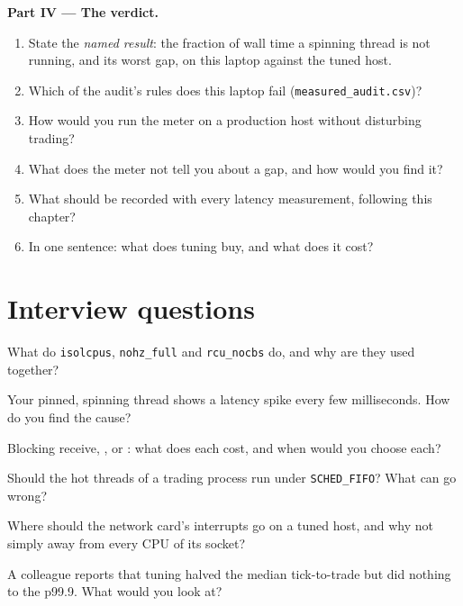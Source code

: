 \begin{problem}
\medskip\noindent\textbf{Part IV --- The verdict.}
\begin{enumerate}[resume]
\item State the \emph{named result}: the fraction of wall time a spinning thread is not running, and its worst gap, on this
laptop against the tuned host.
\item Which of the audit's rules does this laptop fail (\texttt{measured\_audit.csv})?
\item How would you run the meter on a production host without disturbing trading?
\item What does the meter not tell you about a gap, and how would you find it?
\item What should be recorded with every latency measurement, following this chapter?
\item In one sentence: what does tuning buy, and what does it cost?
\end{enumerate}
\end{problem}

\section{Interview questions}

\begin{interviewq}\label{iq:ll:linux-tuning:1}
What do \texttt{isolcpus}, \texttt{nohz\_full} and \texttt{rcu\_nocbs} do, and why are they used together?
\end{interviewq}

\begin{interviewq}\label{iq:ll:linux-tuning:2}
Your pinned, spinning thread shows a latency spike every few milliseconds. How do you find the cause?
\end{interviewq}

\begin{interviewq}\label{iq:ll:linux-tuning:3}
Blocking receive, , or : what does each cost, and when would you choose each?
\end{interviewq}

\begin{interviewq}\label{iq:ll:linux-tuning:4}
Should the hot threads of a trading process run under \texttt{SCHED\_FIFO}? What can go wrong?
\end{interviewq}

\begin{interviewq}\label{iq:ll:linux-tuning:5}
Where should the network card's interrupts go on a tuned host, and why not simply away from every CPU of its socket?
\end{interviewq}

\begin{interviewq}\label{iq:ll:linux-tuning:6}
A colleague reports that tuning halved the median tick-to-trade but did nothing to the p99.9. What would you look at?
\end{interviewq}
